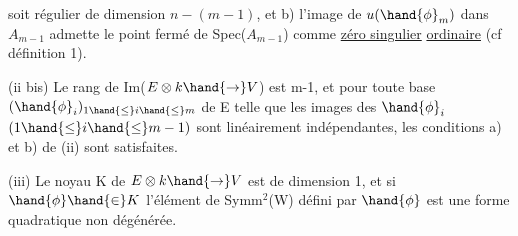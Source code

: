 \margin{\unsure{$\diagup$}}

soit  régulier de dimension $n-(m-1)$, et b) l'image de $u(\hand{\phi}_m)$
dans $A_{m-1}$ admette le point fermé de Spec($A_{m-1}$) comme \uline{zéro singulier}
\uline{ordinaire} (cf définition 1).

(ii bis)  Le rang de Im($E\otimes k \hand{\to} V$) est m-1, et pour
toute base $(\hand{\phi}_i)_{1\hand{\leq} i\hand{\leq} m}$ de E telle que les images des $\hand{\phi}_i$ $(1\hand{\leq} i\hand{\leq} m-1)$ 
sont linéairement indépendantes, les conditions a) et b) de (ii) sont
satisfaites.

(iii) Le noyau  K de $E\otimes k \hand{\to} V$ est de dimension 1, et si $\hand{\phi}\hand{\in} K$
 l'élément de Symm$^2$(W) défini par $\hand{\phi}$ est une forme quadratique
non dégénérée.

